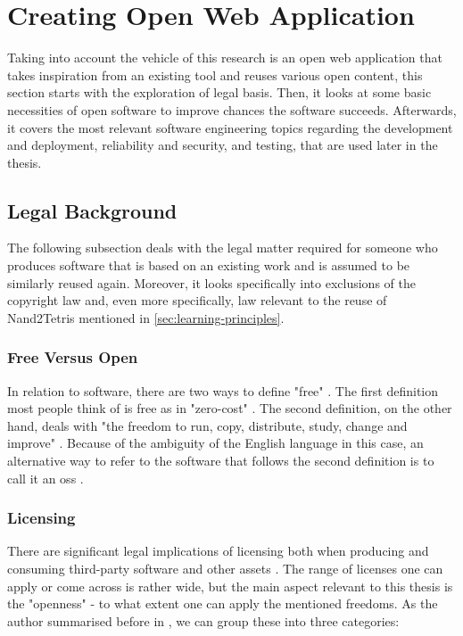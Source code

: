 \section{Creating Open Web Application}
\label{sec:creating-application}

Taking into account the vehicle of this research is an open web application that takes inspiration from an existing tool and reuses various open content, this section starts with the exploration of legal basis.
Then, it looks at some basic necessities of open software to improve chances the software succeeds.
Afterwards, it covers the most relevant software engineering topics regarding the development and deployment, reliability and security, and testing, that are used later in the thesis.

\subsection{Legal Background}

The following subsection deals with the legal matter required for someone who produces software that is based on an existing work and is assumed to be similarly reused again.
Moreover, it looks specifically into exclusions of the copyright law and, even more specifically, law relevant to the reuse of Nand2Tetris mentioned in \autoref{sec:learning-principles}.

\subsubsection{Free Versus Open}

In relation to software, there are two ways to define "free" \parencite[Chapter~1]{Fogel_2022}.
The first definition most people think of is free as in "zero-cost" \parencite[Chapter~1]{Fogel_2022}.
The second definition, on the other hand, deals with "the freedom to run, copy, distribute, study, change and improve" \parencite{FFS_2023}.
Because of the ambiguity of the English language in this case, an alternative way to refer to the software that follows the second definition is to call it an \gls{oss} \parencite{Fogel_2022}.

\subsubsection{Licensing}

There are significant legal implications of licensing both when producing and consuming third-party software and other assets \parencites[Chapter~9]{Fogel_2022}[pp. 11-12]{Duras_2020}.
The range of licenses one can apply or come across is rather wide, but the main aspect relevant to this thesis is the "openness" - to what extent one can apply the mentioned freedoms.
As the author summarised before in \textcite{Duras_2020}, we can group these into three categories:

